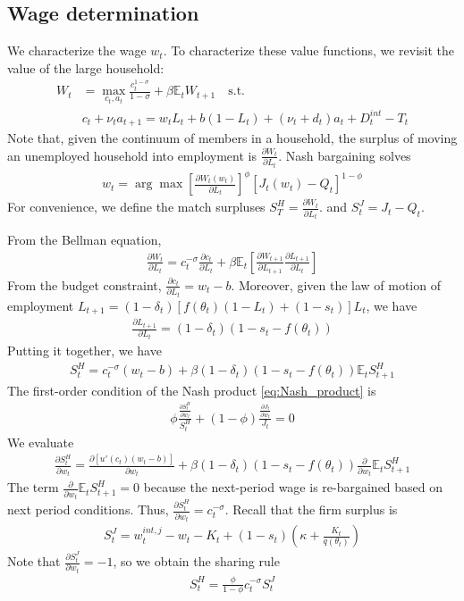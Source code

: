 \documentclass[authoryear, review, 12pt]{elsarticle}
\newcommand{\der}[2]{\frac{\partial #1}{\partial #2}}
\begin{document}
	\subsection{Wage determination}
	We characterize the wage $w_t$. To characterize these value functions, we revisit the value of the large household:
	\begin{align}
		W_t&=\max_{c_t,a_t} \frac{c_t^{1-\sigma}}{1-\sigma}+\beta \mathbb{E}_t W_{t+1} \quad \text{s.t.}\\
		&c_t+\nu_ta_{t+1}=w_tL_t+b(1-L_t)+(\nu_t+d_t)a_t+D_t^{int} -T_t
	\end{align}
	Note that, given the continuum of members in a household, the surplus of moving an unemployed household into employment is $\der{W_t}{L_t}$. Nash bargaining solves
	\begin{align}\label{eq:Nash_product}
		w_t=\arg \max [\der{W_t(w_t)}{L_t}]^{\phi}[J_t(w_t)-Q_t]^{1-\phi}
	\end{align}
	For convenience, we define the match surpluses $S_T^H = \der{W_t}{L_t}$. and $S_t^J=J_t-Q_t$.
	
	From the Bellman equation,
	\begin{align} \label{eq:Nash_rule}
		\der{W_t}{L_t}=c_t^{-\sigma}\der{c_t}{L_t}+\beta \mathbb{E}_t[\der{W_{t+1}}{L_{t+1}}\der{L_{t+1}}{L_t}]
	\end{align}
	From the budget constraint, $\der{c_t}{L_t}=w_t-b$. Moreover, given the law of motion of employment $L_{t+1}=(1-\delta_t)[f(\theta_t)(1-L_t)+(1-s_t)]L_t$, we have
	\begin{align}
		\der{L_{t+1}}{L_t}=(1-\delta_t)(1-s_t-f(\theta_t))
	\end{align}
	Putting it together, we have
	\begin{align}
		S_t^H=c_t^{-\sigma}(w_t-b)+\beta(1-\delta_t)(1-s_t-f(\theta_t))\mathbb{E}_tS_{t+1}^H
	\end{align}
	The first-order condition of the Nash product \eqref{eq:Nash_product} is
	\begin{align}
		\phi \frac{\der{S_t^H}{w_t}}{S_t^H}+(1-\phi)\frac{\der{J_t}{w_t}}{J_t}=0
	\end{align}
	We evaluate
	\begin{align}
		\der{S_t^H}{w_t}=\der{[u'(c_t)(w_t-b)]}{w_t}+\beta(1-\delta_t)(1-s_t-f(\theta_t))\der{}{w_t}\mathbb{E}_tS_{t+1}^H
	\end{align}
	The term $\der{}{w_t}\mathbb{E}_tS_{t+1}^H=0$ because the next-period wage is re-bargained based on next period conditions. Thus, $\der{S_t^H}{w_t}=c_t^{-\sigma}$.
	Recall that the firm surplus is
	\begin{align}
		S_t^J=w_t^{int,j}-w_t-K_t +(1-s_t)\left(\kappa+\frac{K_t}{q(\theta_t)}\right)
	\end{align}
	Note that $\der{S_t^J}{w_t}=-1$, so we obtain the sharing rule
	\begin{align}
		S_t^H=\frac{\phi}{1-\phi}c_t^{-\sigma}S_t^J
	\end{align}
	
\end{document}
